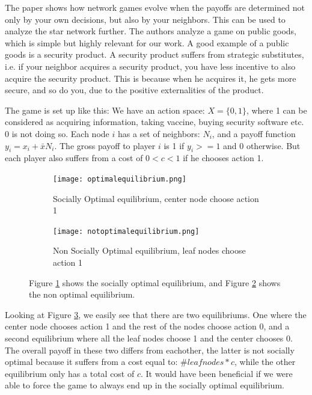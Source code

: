 The paper \cite{networkgames} shows how network games evolve when the payoffs are determined not only by your own decisions, but also by your neighbors. This can be used to analyze the star network further. The authors analyze a game on public goods, which is simple but highly relevant for our work. A good example of a public goods is a security product. A security product suffers from strategic substitutes, i.e. if your neighbor acquires a security product, you have less incentive to also acquire the security product. This is because when he acquires it, he gets more secure, and so do you, due to the positive externalities of the product.

The game is set up like this:
We have an action space: $X=\{0,1\}$, where 1 can be considered as acquiring information, taking vaccine, buying security software etc. 0 is not doing so.
Each node $i$ has a set of neighbors: $N_{i} $, and a payoff function $y_{i}=x_{i}+\bar{x}N_{i}$. 
The gross payoff to player $i$ is 1 if $y_{i}>=1$ and 0 otherwise. But each player also suffers from a cost of $0<c<1$ if he chooses action 1.
\begin{figure}[h]
\centering
\begin{subfigure}{.4\textwidth}
  \centering
  \texttt{[image: optimalequilibrium.png]}
  \caption{\label{fig:optequi} Socially Optimal equilibrium, center node choose action 1}
\end{subfigure}
\quad
\begin{subfigure}{.4\textwidth}
  \centering
  \texttt{[image: notoptimalequilibrium.png]}
  \caption{\label{fig:notoptequi} Non Socially Optimal equilibrium, leaf nodes choose action 1}
\end{subfigure}
\caption[Socially and non socially optimal equilibrium of a star]{\label{fig:starequi} Figure \ref{fig:optequi} shows the socially optimal equilibrium, and Figure \ref{fig:notoptequi} shows the non optimal equilibrium.}

\end{figure}
Looking at Figure \ref{fig:starequi}, we easily see that there are two equilibriums. One where the center node chooses action 1 and the rest of the nodes choose action 0, and a second equilibrium where all the leaf nodes choose 1 and the center chooses 0.
The overall payoff in these two differs from eachother, the latter is not socially optimal because it
 suffers from a cost equal to: $\#leaf nodes*c$, while the other equilibrium only has a total cost of $c$.
 It would have been beneficial if we were able to force the game to always end up in the socially optimal equilibrium.


